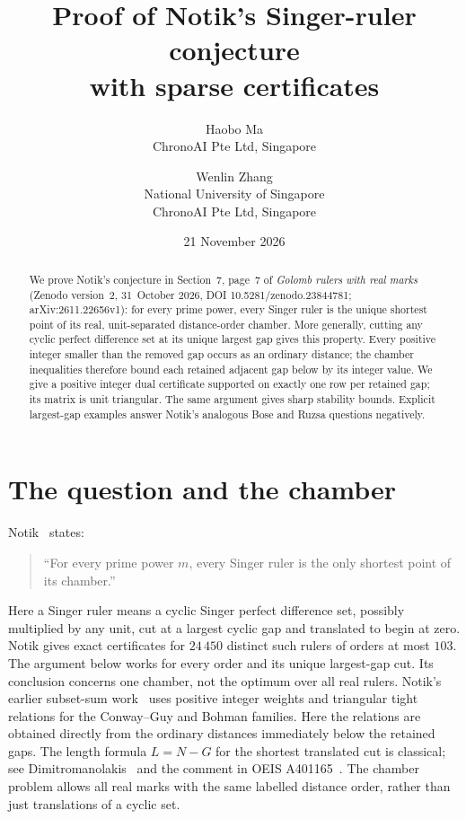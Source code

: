 \documentclass[11pt,a4paper]{article}
\title{Proof of Notik's Singer-ruler conjecture\\with sparse certificates}
\author{Haobo Ma\\\small ChronoAI Pte Ltd, Singapore
\and Wenlin Zhang\\\small National University of Singapore\\\small ChronoAI Pte Ltd, Singapore}
\date{21 November 2026}
\begin{document}
\maketitle
\begin{abstract}
We prove Notik's conjecture in Section~7, page~7 of
\emph{Golomb rulers with real marks} (Zenodo version~2,
31~October 2026, DOI 10.5281/zenodo.23844781;
arXiv:2611.\allowbreak22656v1):
for every prime power, every Singer ruler is the unique shortest
point of its real, unit-separated distance-order chamber.
More generally, cutting any cyclic perfect difference set at its unique largest
gap gives this property. Every positive integer smaller than the removed
gap occurs as an ordinary distance; the chamber inequalities therefore
bound each retained adjacent gap below by its integer value.
We give a positive integer dual certificate supported on exactly one row
per retained gap; its matrix is unit triangular. The same argument gives
sharp stability bounds. Explicit largest-gap examples answer Notik's
analogous Bose and Ruzsa questions negatively.
\end{abstract}

\section{The question and the chamber}

Notik~\cite[Section~7, p.~7]{notik} states:
\begin{quote}
``For every prime power $m$, every Singer ruler is the only shortest point
of its chamber.''
\end{quote}
Here a Singer ruler means a cyclic Singer perfect difference set, possibly
multiplied by any unit, cut at a largest cyclic gap and translated to begin
at zero. Notik gives exact certificates for $24\,450$ distinct such rulers
of orders at most $103$. The argument below works for every order and
its unique largest-gap cut. Its conclusion concerns one chamber,
not the optimum over all real rulers.
Notik's earlier subset-sum work~\cite[Theorems~3.2, 4.3 and~4.4]{subset} uses
positive integer weights and triangular tight relations for the
Conway--Guy and Bohman families. Here the relations are obtained directly
from the ordinary distances immediately below the retained gaps.
The length formula $L=N-G$ for the shortest translated cut is
classical; see Dimitromanolakis~\cite[Section~5.7.1, pp.~48--49]{dimitro}
and the comment in OEIS A401165~\cite{oeisgap}.
The chamber problem allows all real marks with the same labelled
distance order, rather than just translations of a cyclic set.
\end{document}
